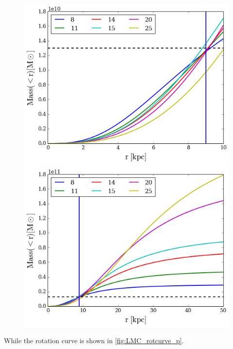 \begin{figure}[H]{\label{fig:LMC_mass_p}}
\centering
\includegraphics[scale=0.4]{LMC_mass_plummer.png}
\includegraphics[scale=0.4]{LMC_mass_plummer_out.png}
\end{figure}
While the rotation curve is shown in \ref{fig:LMC_rotcurve_p}. \\
 
